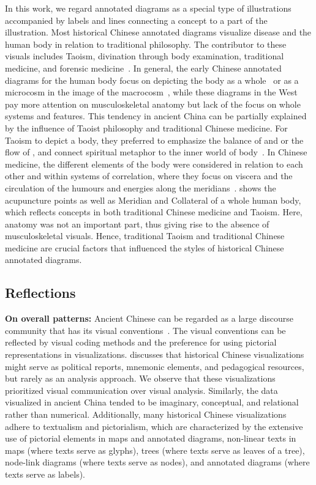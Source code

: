 In this work, we regard annotated diagrams as a special type of illustrations accompanied by labels and lines connecting a concept to a part of the illustration. 
Most historical Chinese annotated diagrams visualize disease and the human body in relation to traditional philosophy.
The contributor to these visuals includes Taoism, divination through body examination, traditional medicine, and forensic medicine~\cite{Despeux2007Body}.
In general, the early Chinese annotated diagrams for the human body focus on depicting the body as a whole~\cite{Huang2015Picturing, Correll2024When} or as a microcosm in the image of the macrocosm~\cite{Despeux2007Body}, while these diagrams in the West pay more attention on musculoskeletal anatomy but lack of the focus on whole systems and features.
This tendency in ancient China can be partially explained by the influence of Taoist philosophy and traditional Chinese medicine.
For Taoism to depict a body, they preferred to emphasize the balance of  and  or the flow of , and connect spiritual metaphor to the inner world of body~\cite{Despeux2007Body}.
In Chinese medicine, the different elements of the body were considered in relation to each other and within systems of correlation, where they focus on viscera and the circulation of the humours and energies along the meridians~\cite{Despeux2007Body}.
 shows the acupuncture points as well as Meridian and Collateral of a whole human body, which reflects concepts in both traditional Chinese medicine and Taoism.
Here, anatomy was not an important part, thus giving rise to the absence of musculoskeletal visuals.
Hence, traditional Taoism and traditional Chinese medicine are crucial factors that influenced the styles of historical Chinese annotated diagrams.

\subsection{Reflections}

\textbf{On overall patterns:}
Ancient Chinese can be regarded as a large discourse community that has its visual conventions~\cite{Kostelnick2003Shaping}.
The visual conventions can be reflected by  visual coding methods and the preference for using pictorial representations in visualizations.
 discusses that historical Chinese visualizations might serve as political reports, mnemonic elements, and pedagogical resources, but rarely as an analysis approach.
We observe that these visualizations prioritized visual communication over visual analysis.
Similarly, the data visualized in ancient China tended to be imaginary, conceptual, and relational rather than numerical.
Additionally, many historical Chinese visualizations adhere to textualism and pictorialism, which are characterized by the extensive use of pictorial elements in maps and annotated diagrams, non-linear texts in maps (where texts serve as glyphs), trees (where texts serve as leaves of a tree), node-link diagrams (where texts serve as nodes), and annotated diagrams (where texts serve as labels).

